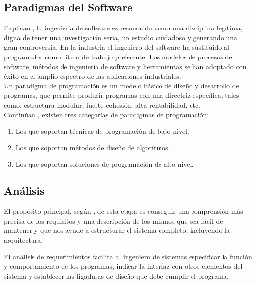 \documentclass[12pt]{article}
\begin{document}
	\subsection{Paradigmas del Software}

	\hspace{1.27cm}Explican \textcite{maida_metodologias_2015}, la ingeniería de software es reconocida como una disciplina legítima, digna de tener una investigación seria, un estudio cuidadoso y generando una gran controversia. En la industria el ingeniero del software ha sustituido al programador como título de trabajo preferente. Los modelos de procesos de software, métodos de ingeniería de software y herramientas se han adoptado con éxito en el amplio espectro de las aplicaciones industriales. \\

	\hspace{1.27cm}Un paradigma de programación es un modelo básico de diseño y desarrollo de programas, que	permite producir programas con una directriz específica, tales como: estructura modular, fuerte cohesión, alta rentabilidad, etc. \\

	\hspace{1.27cm}Continúan \textcite{maida_metodologias_2015}, existen tres categorías de paradigmas de programación:

	\begin{enumerate}[left=1.27cm]
		\item Los que soportan técnicas de programación de bajo nivel.
		\item Los que soportan métodos de diseño de algoritmos.
		\item Los que soportan soluciones de programación de alto nivel.
	\end{enumerate}

	\subsection{Análisis}

	\hspace{1.27cm}El propósito principal, según \textcite{maida_metodologias_2015}, de esta etapa es conseguir una comprensión más precisa de los requisitos y una descripción de los mismos que sea fácil de mantener y que nos ayude a estructurar el sistema completo, incluyendo la arquitectura.

	\hspace{1.27cm}El análisis de requerimientos facilita al ingeniero de sistemas especificar la función y comportamiento de los programas, indicar la interfaz con otros elementos del sistema y establecer las ligaduras de diseño que debe cumplir el programa.
\end{document}
